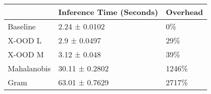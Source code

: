 \begin{tabular}{lll}
\toprule
{} & Inference Time (Seconds) & Overhead \\
\midrule
Baseline    &            2.24 ± 0.0102 &       0\% \\
X-OOD L     &             2.9 ± 0.0497 &      29\% \\
X-OOD M     &             3.12 ± 0.048 &      39\% \\
Mahalanobis &           30.11 ± 0.2802 &    1246\% \\
Gram        &           63.01 ± 0.7629 &    2717\% \\
\bottomrule
\end{tabular}
